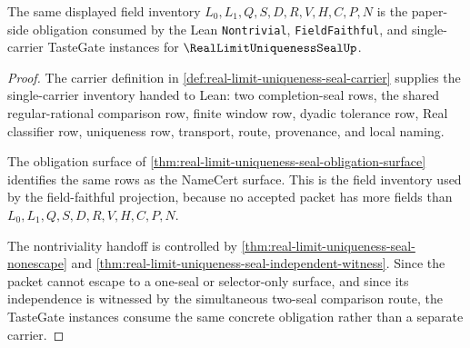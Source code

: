 \begin{theorem}
\label{thm:real-limit-uniqueness-seal-tastegate-handoff}
The same displayed field inventory $L_0,L_1,Q,S,D,R,V,H,C,P,N$ is the paper-side obligation consumed by the Lean \texttt{Nontrivial}, \texttt{FieldFaithful}, and single-carrier TasteGate instances for $\RealLimitUniquenessSealUp$.
\end{theorem}
\begin{proof}
The carrier definition in \autoref{def:real-limit-uniqueness-seal-carrier} supplies the single-carrier inventory handed to Lean: two completion-seal rows, the shared regular-rational comparison row, finite window row, dyadic tolerance row, Real classifier row, uniqueness row, transport, route, provenance, and local naming.

The obligation surface of \autoref{thm:real-limit-uniqueness-seal-obligation-surface} identifies the same rows as the NameCert surface. This is the field inventory used by the field-faithful projection, because no accepted packet has more fields than $L_0,L_1,Q,S,D,R,V,H,C,P,N$.

The nontriviality handoff is controlled by \autoref{thm:real-limit-uniqueness-seal-nonescape} and \autoref{thm:real-limit-uniqueness-seal-independent-witness}. Since the packet cannot escape to a one-seal or selector-only surface, and since its independence is witnessed by the simultaneous two-seal comparison route, the TasteGate instances consume the same concrete obligation rather than a separate carrier.
\end{proof}

